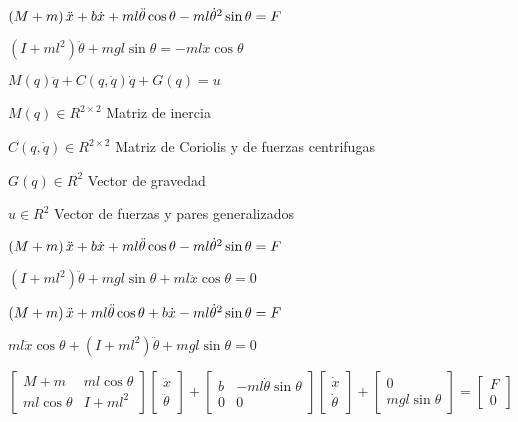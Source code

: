 \documentclass{article}
\begin{document}
$\left( M+m\right) \ddot{x}+b\dot{x}+ml\ddot{\theta}\cos \theta -ml\dot{%
\theta}^{2}\sin \theta =F$

$\left( I+ml^{2}\right) \ddot{\theta}+mgl\sin \theta =-ml\ddot{x}\cos \theta 
$

$M(q)\ddot{q}+C(q,\dot{q})\dot{q}+G(q)=u$

$M(q)\in R^{2\times 2}$ Matriz de inercia

$C(q,\dot{q})\in R^{2\times 2}$ Matriz de Coriolis y de fuerzas centrifugas

$G(q)\in R^{2}$ Vector de gravedad

$u\in R^{2}$ Vector de fuerzas y pares generalizados

$\left( M+m\right) \ddot{x}+b\dot{x}+ml\ddot{\theta}\cos \theta -ml\dot{%
\theta}^{2}\sin \theta =F$

$\left( I+ml^{2}\right) \ddot{\theta}+mgl\sin \theta +ml\ddot{x}\cos \theta
=0$

$\left( M+m\right) \ddot{x}+ml\ddot{\theta}\cos \theta +b\dot{x}-ml\dot{%
\theta}^{2}\sin \theta =F$

$ml\ddot{x}\cos \theta +\left( I+ml^{2}\right) \ddot{\theta}+mgl\sin \theta
=0$

$\left[ 
\begin{array}{cc}
M+m & ml\cos \theta  \\ 
ml\cos \theta  & I+ml^{2}%
\end{array}%
\right] \left[ 
\begin{array}{c}
\ddot{x} \\ 
\ddot{\theta}%
\end{array}%
\right] +\left[ 
\begin{array}{cc}
b & -ml\dot{\theta}\sin \theta  \\ 
0 & 0%
\end{array}%
\right] \left[ 
\begin{array}{c}
\dot{x} \\ 
\dot{\theta}%
\end{array}%
\right] +\left[ 
\begin{array}{c}
0 \\ 
mgl\sin \theta 
\end{array}%
\right] =\left[ 
\begin{array}{c}
F \\ 
0%
\end{array}%
\right] $
\end{document}
